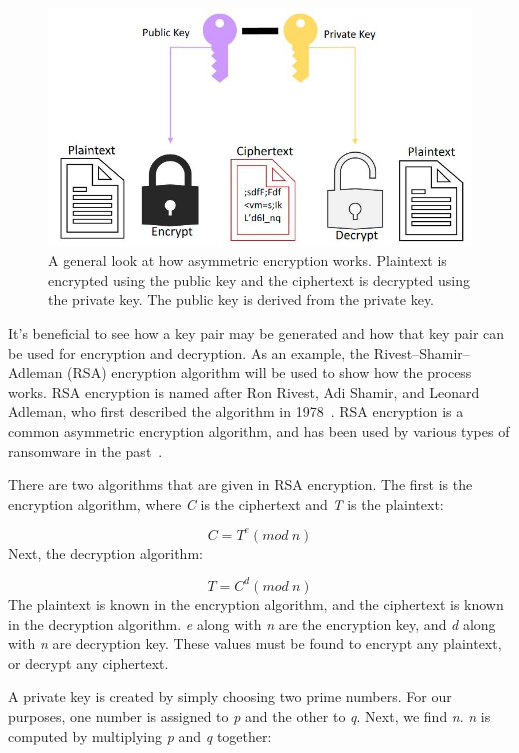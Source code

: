 \documentclass{IEEEtran}
\begin{document}
\begin{figure}[h]
\includegraphics[width=\linewidth]{ae.JPG}
  \caption{A general look at how asymmetric encryption works. Plaintext is encrypted using the public key and the ciphertext is decrypted using the private key. The public key is derived from the private key. }
  \label{fig:asymenc}
\end{figure}

It's beneficial to see how a key pair may be generated and how that key pair can be used for encryption and decryption. As an example, the Rivest–Shamir–Adleman (RSA) encryption algorithm will be used to show how the process works. RSA encryption is named after Ron Rivest, Adi Shamir, and Leonard Adleman, who first described the algorithm in 1978~\cite{RN28}. RSA encryption is a common asymmetric encryption algorithm, and has been used by various types of ransomware in the past~\cite{RN25,RN21,RN22,RN26,RN14}.

There are two algorithms that are given in RSA encryption. The first is the encryption algorithm, where \textit{C} is the ciphertext and \textit{T} is the plaintext:

\[C = T^e(mod~n) \]\label{eq3}
Next, the decryption algorithm:

\[T = C^d(mod~n) \]\label{eq4}
The plaintext is known in the encryption algorithm, and the ciphertext is known in the decryption algorithm. \textit{e} along with \textit{n} are the encryption key, and \textit{d} along with \textit{n} are decryption key. These values must be found to encrypt any plaintext, or decrypt any ciphertext.

A private key is created by simply choosing two prime numbers. For our purposes, one number is assigned to \textit{p} and the other to \textit{q}. Next, we find \textit{n}. \textit{n} is computed by multiplying \textit{p} and \textit{q} together:
\end{document}
